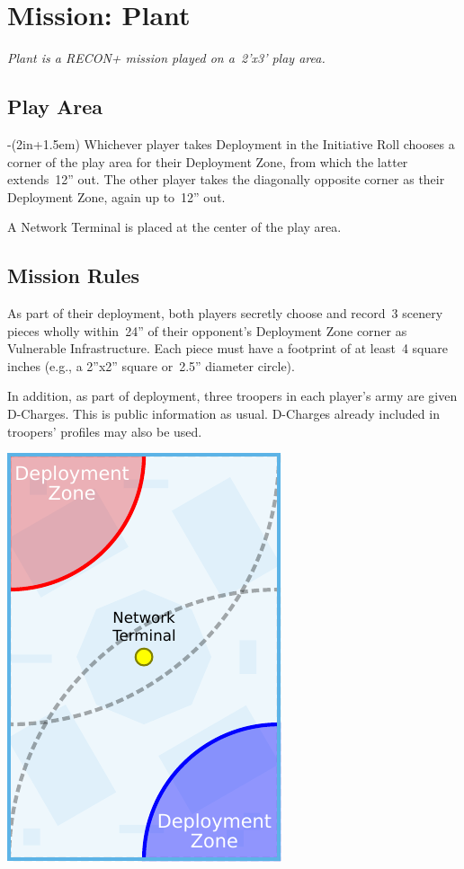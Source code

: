 \chapter{Mission: Plant}

\emph{\emph{Plant} is a RECON+ mission played on a~2'x3' play area.}


\section{Play Area}
\vspace{-2\parskip}
\noindent\begin{stdminipage}{\linewidth-(2in+1.5em)}
\vspace{0pt}   
\noindent
Whichever player takes Deployment in the Initiative Roll chooses a
corner of the play area for their Deployment Zone, from which the
latter extends~12'' out.  The other player takes the diagonally
opposite corner as their Deployment Zone, again up to~12'' out.

A Network Terminal is placed at the center of the play area.

\section{Mission Rules}
As part of their deployment, both players secretly choose and record~3
scenery pieces wholly within~24'' of their opponent's Deployment Zone
corner as Vulnerable Infrastructure.  Each piece must have a footprint
of at least~4 square inches (e.g., a 2''x2'' square or~2.5'' diameter
circle).

In addition, as part of deployment, three troopers in each player's
army are given D-Charges.  This is public information as usual.
D-Charges already included in troopers' profiles may also be used.

\end{stdminipage}
\hfill
\begin{minipage}[t]{2in}\centering
\vspace{4pt}   
\includegraphics{maps/map-plant}
\end{minipage}

